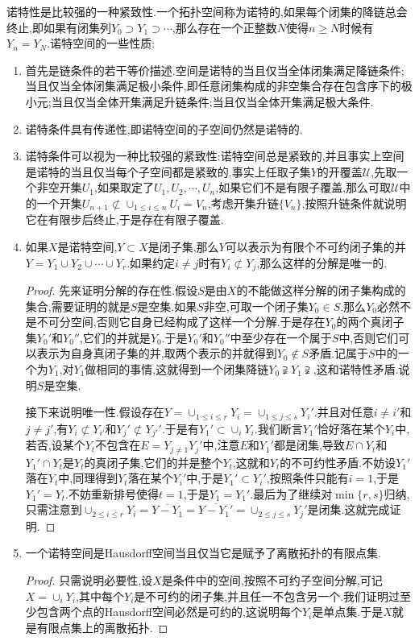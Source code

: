 诺特性是比较强的一种紧致性.一个拓扑空间称为诺特的,如果每个闭集的降链总会终止,即如果有闭集列$Y_0\supset Y_1\supset\cdots$,那么存在一个正整数$N$使得$n\ge N$时候有$Y_n=Y_N$.诺特空间的一些性质:
\begin{enumerate}
	\item 首先是链条件的若干等价描述.空间是诺特的当且仅当全体闭集满足降链条件;当且仅当全体闭集满足极小条件,即任意闭集构成的非空集合存在包含序下的极小元;当且仅当全体开集满足升链条件;当且仅当全体开集满足极大条件.
	\item 诺特条件具有传递性,即诺特空间的子空间仍然是诺特的.
	\item 诺特条件可以视为一种比较强的紧致性:诺特空间总是紧致的,并且事实上空间是诺特的当且仅当每个子空间都是紧致的.事实上任取子集$Y$的开覆盖$\mathscr{U}$,先取一个非空开集$U_1$,如果取定了$U_1,U_2,\cdots,U_n$,如果它们不是有限子覆盖,那么可取$\mathscr{U}$中的一个开集$U_{n+1}\not\subset\cup_{1\le i\le n}U_i=V_n$,考虑开集升链$\{V_n\}$,按照升链条件就说明它在有限步后终止,于是存在有限子覆盖.
	\item 如果$X$是诺特空间,$Y\subset X$是闭子集,那么$Y$可以表示为有限个不可约闭子集的并$Y=Y_1\cup Y_2\cup\cdots\cup Y_r$.如果约定$i\not=j$时有$Y_i\not\subset Y_j$,那么这样的分解是唯一的.
	\begin{proof}
		
		先来证明分解的存在性.假设$S$是由$X$的不能做这样分解的闭子集构成的集合,需要证明的就是$S$是空集.如果$S$非空,可取一个闭子集$Y_0\in S$.那么$Y_0$必然不是不可分空间,否则它自身已经构成了这样一个分解.于是存在$Y_0$的两个真闭子集$Y_0'$和$Y_0''$,它们的并就是$Y_0$.于是$Y_0'$和$Y_0''$中至少存在一个属于$S$中,否则它们可以表示为自身真闭子集的并,取两个表示的并就得到$Y_0\not\in S$矛盾.记属于$S$中的一个为$Y_1$,对$Y_1$做相同的事情,这就得到一个闭集降链$Y_0\supsetneqq Y_1\supsetneqq$,这和诺特性矛盾.说明$S$是空集.
		
		接下来说明唯一性.假设存在$Y=\cup_{1\le i\le r}Y_i=\cup_{1\le j\le s}Y_i'$.并且对任意$i\not=i'$和$j\not=j'$,有$Y_i\not\subset Y_{i'}$和$Y_j'\not\subset Y_{j'}'$.于是有$Y_1'\subset\cup_i Y_i$.我们断言$Y_1'$恰好落在某个$Y_i$中,若否,设某个$Y_t$不包含在$E=Y_{j\not=1}Y_j'$中,注意$E$和$Y_1'$都是闭集,导致$E\cap Y_t$和$Y_1'\cap Y_t$是$Y_t$的真闭子集,它们的并是整个$Y_t$,这就和$Y_t$的不可约性矛盾.不妨设$Y_1'$落在$Y_t$中,同理得到$Y_t$落在某个$Y_i'$中,于是$Y_1'\subset Y_i'$,按照条件只能有$i=1$,于是$Y_1'=Y_t$.不妨重新排号使得$t=1$,于是$Y_1=Y_1'$.最后为了继续对$\min\{r,s\}$归纳,只需注意到$\cup_{2\le i\le r}Y_i=\overline{Y-Y_1}=\overline{Y-Y_1'}=\cup_{2\le j\le s}Y_j'$是闭集.这就完成证明.
	\end{proof}
	\item 一个诺特空间是Hausdorff空间当且仅当它是赋予了离散拓扑的有限点集.
	\begin{proof}
		
		只需说明必要性,设$X$是条件中的空间,按照不可约子空间分解,可记$X=\cup_iY_i$,其中每个$Y_i$是不可约的闭子集,并且任一不包含另一个.我们证明过至少包含两个点的Hausdorff空间必然是可约的,这说明每个$Y_i$是单点集.于是$X$就是有限点集上的离散拓扑.
	\end{proof}
\end{enumerate}
\newpage
